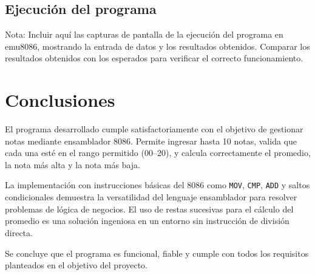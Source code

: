 \documentclass[12pt,a4paper]{article}
\begin{document}
\subsection{Ejecuci\'on del programa}

Nota: Incluir aqu\'i las capturas de pantalla de la ejecuci\'on del programa en emu8086, mostrando la entrada de datos y los resultados obtenidos. Comparar los resultados obtenidos con los esperados para verificar el correcto funcionamiento.

\section*{Conclusiones}

El programa desarrollado cumple satisfactoriamente con el objetivo de gestionar notas mediante ensamblador 8086. Permite ingresar hasta 10 notas, valida que cada una est\'e en el rango permitido (00--20), y calcula correctamente el promedio, la nota m\'as alta y la nota m\'as baja.

La implementaci\'on con instrucciones b\'asicas del 8086 como \texttt{MOV}, \texttt{CMP}, \texttt{ADD} y saltos condicionales demuestra la versatilidad del lenguaje ensamblador para resolver problemas de l\'ogica de negocios. El uso de restas sucesivas para el c\'alculo del promedio es una soluci\'on ingeniosa en un entorno sin instrucci\'on de divisi\'on directa.

Se concluye que el programa es funcional, fiable y cumple con todos los requisitos planteados en el objetivo del proyecto.
\end{document}
